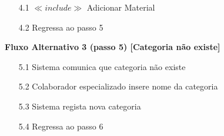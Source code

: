 \documentclass[../relatorio.tex]{subfiles}
\begin{document}
\begin{itemize}
\begin{itemize}
		      \item[4.1]  $\ll include \gg$ Adicionar Material
              \item[4.2] Regressa ao passo 5
	      \end{itemize}
          \begin{flushleft}
            \textbf{Fluxo Alternativo 3 (passo 5) [Categoria não existe]}
        \end{flushleft}
        \begin{itemize}
            \item[5.1] Sistema comunica que categoria não existe 
            \item[5.2] Colaborador especializado insere nome da categoria 
            \item[5.3] Sistema regista nova categoria
            \item[5.4] Regressa ao passo 6
        \end{itemize}
\end{itemize}
\end{document}
